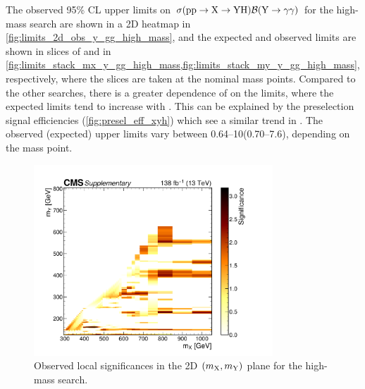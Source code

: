The observed 95\% CL upper limits on $\sigma(\mathrm{p}\mathrm{p} \to \mathrm{X} \to \mathrm{Y}\mathrm{H})\mathcal{B}(\mathrm{Y} \to \gamma\gamma)$ for the high-mass \XYggHtt search are shown in a 2D heatmap in \cref{fig:limits_2d_obs_y_gg_high_mass}, and the expected and observed limits are shown in slices of \mX and \mY in \cref{fig:limits_stack_mx_y_gg_high_mass,fig:limits_stack_my_y_gg_high_mass}, respectively, where the slices are taken at the nominal mass points. Compared to the other \XYH searches, there is a greater dependence of \mY on the limits, where the expected limits tend to increase with \mY. This can be explained by the preselection signal efficiencies (\cref{fig:presel_eff_xyh}) which see a similar trend in \mY. The observed (expected) upper limits vary between 0.64--10\fb (0.70--7.6\fb), depending on the mass point.

\vspace{\fill}

\begin{figure}[h]
    \centering
    \includegraphics[width=0.8\textwidth]{Figures/Dihiggs/results/significances/significance_y_gg_high_mass_supplementary.pdf}
    \caption[High-Mass \XYggHtt Observed Local Significances]{Observed local significances in the 2D $(m_{\mathrm{X}},m_{\mathrm{Y}})$ plane for the high-mass \XYggHtt search.}\label{fig:significance_y_gg_high_mass}
\end{figure}

